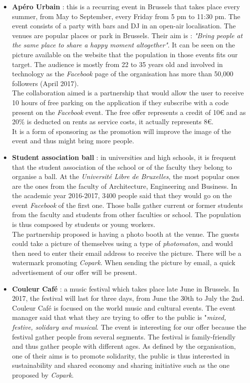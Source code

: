 \documentclass[12pt,a4paper,oneside]{book}
\newcommand{\bp}{\textit{Copark}}
\begin{document}
\begin{itemize}
\item \textbf{Apéro Urbain} : this is a recurring event in Brussels that takes place every summer, from May to September, every Friday from 5 pm to 11:30 pm. The event consists of a party with bars and DJ in an open-air localisation. The venues are popular places or park in Brussels. Their aim is : \textit{"Bring people at the same place to share a happy moment altogether"}.\cite{aperourbain} It can be seen on the picture available on the website that the population in those events fits our target. The audience is mostly from 22 to 35 years old and involved in technology as the \textit{Facebook} page of the organisation has more than 50,000 followers (April 2017).\\
The collaboration aimed is a partnership that would allow the user to receive 10 hours of free parking on the application if they subscribe with a code present on the \textit{Facebook} event. The free offer represents a credit of 10\euro{} and as 20\% is deducted on rents as service costs, it actually represents 8\euro{}.\\
It is a form of sponsoring as the promotion will improve the image of the event and thus might bring more people.
\item \textbf{Student association ball} : in universities and high schools, it is frequent that the student association of the school or of the faculty they belong to organise a ball. At the \textit{Université Libre de Bruxelles}, the most popular ones are the ones from the faculty of Architecture, Engineering and Business. In the academic year 2016-2017, 3400 people said that they would go on the event \textit{Facebook} of the first one. Those balls gather current or former students from the faculty and students from other faculties or school. The population is thus composed by students or young workers.\\
The partnership proposed is having a photo booth at the venue. The guests could take a picture of themselves using a type of \textit{photomaton}, and would then need to enter their email address to receive the picture. There will be a watermark promoting \bp{}. When sending the picture by email, a quick advertisement of our offer will be present.
\item \textbf{Couleur Café} : a music festival which takes place late June in Brussels. In 2017, the festival will last for three days, from June the 30th to July the 2nd. Couleur Café is focused on the world music and cultural events. The event manager said that what they are trying to offer to the public is "\textit{mixed, festive, solidary and musical}.\cite{rtbfcc} The event is interesting for our offer because the festival gather people from several segments. The festival is family-friendly and thus gather people with different ages. As defined by the organisation, one of their aims is to promote solidarity, the public is thus interested in sustainability and shared economy and sharing initiative such as the one proposed by \bp{}.\\

\end{itemize}
\end{document}

